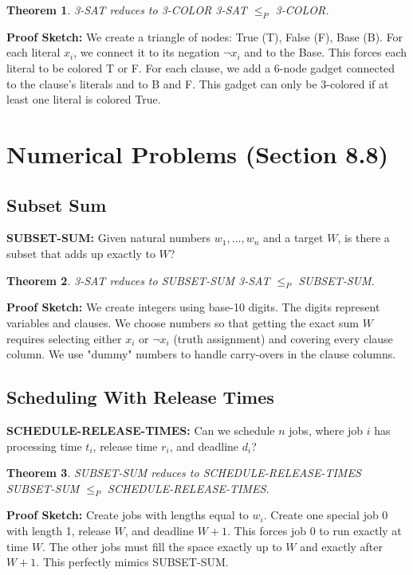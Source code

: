\documentclass[12pt,a4paper]{report}
\newtheorem{theorem}{Theorem}
\begin{document}
\begin{theorem}{3-SAT reduces to 3-COLOR}{}
3-SAT $\leq_P$ 3-COLOR.
\end{theorem}
\textbf{Proof Sketch:} We create a triangle of nodes: True (T), False (F), Base (B). For each literal $x_i$, we connect it to its negation $\neg x_i$ and to the Base. This forces each literal to be colored T or F. For each clause, we add a 6-node gadget connected to the clause's literals and to B and F. This gadget can only be 3-colored if at least one literal is colored True.

\section{Numerical Problems (Section 8.8)}

\subsection{Subset Sum}
\textbf{SUBSET-SUM:} Given natural numbers $w_1, \ldots, w_n$ and a target $W$, is there a subset that adds up exactly to $W$?

\begin{theorem}{3-SAT reduces to SUBSET-SUM}{}
3-SAT $\leq_P$ SUBSET-SUM.
\end{theorem}
\textbf{Proof Sketch:} We create integers using base-10 digits. The digits represent variables and clauses. We choose numbers so that getting the exact sum $W$ requires selecting either $x_i$ or $\neg x_i$ (truth assignment) and covering every clause column. We use "dummy" numbers to handle carry-overs in the clause columns.

\subsection{Scheduling With Release Times}
\textbf{SCHEDULE-RELEASE-TIMES:} Can we schedule $n$ jobs, where job $i$ has processing time $t_i$, release time $r_i$, and deadline $d_i$?

\begin{theorem}{SUBSET-SUM reduces to SCHEDULE-RELEASE-TIMES}{}
SUBSET-SUM $\leq_P$ SCHEDULE-RELEASE-TIMES.
\end{theorem}
\textbf{Proof Sketch:} Create jobs with lengths equal to $w_i$. Create one special job 0 with length 1, release $W$, and deadline $W+1$. This forces job 0 to run exactly at time $W$. The other jobs must fill the space exactly up to $W$ and exactly after $W+1$. This perfectly mimics SUBSET-SUM.
\end{document}
